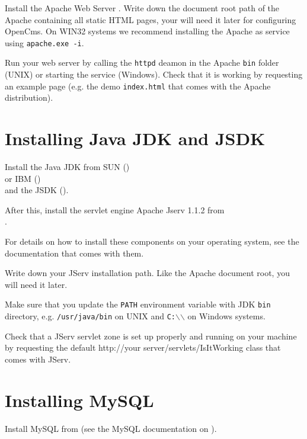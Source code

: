Install the Apache Web Server . 
Write down the document root path of the Apache containing all static HTML 
pages, your will need it later for configuring OpenCms.
On WIN32 systems we recommend installing the Apache as service
using \texttt{apache.exe -i}. 

Run your web server by calling the \texttt{httpd} deamon in the Apache
\texttt{bin} folder (UNIX)
or starting the service (Windows). Check that it
is working by requesting an example page 
(e.g. the demo \texttt{index.html} that comes with the Apache distribution).


\section{\label{42jdk}Installing Java JDK and JSDK}
Install the Java JDK from SUN 
()\\
or IBM () \\
and the JSDK 
().

After this, install the servlet engine Apache Jserv 1.1.2 from \\
.

For details on how to install these components on your operating system,
see the documentation that comes with them.

Write down your JServ installation path. Like the Apache document root, you
will need it later.

Make sure that you update the \texttt{PATH} environment variable with JDK \texttt{bin}
directory, e.g. \texttt{/usr/java/bin} on UNIX and \texttt{C:$\backslash$$\backslash$}
on Windows systems.

Check that a JServ servlet zone is set up properly and running on your 
machine by requesting the default
http://your server/servlets/IsItWorking class that comes with JServ. 

\section{\label{42mysql}Installing MySQL}
Install MySQL from 
(see the MySQL documentation on ). 

